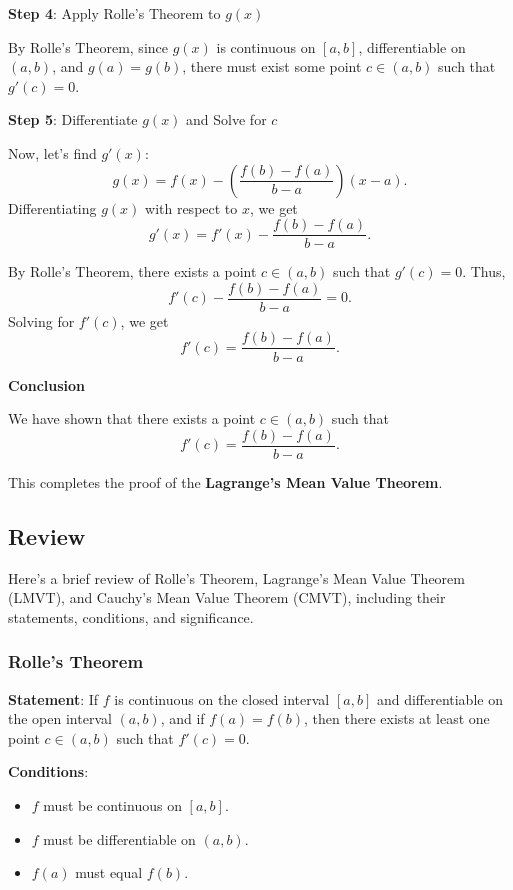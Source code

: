 \documentclass[a4paper,12pt]{book}
\begin{document}
\textbf{Step 4}: Apply Rolle's Theorem to \( g(x) \)

By Rolle's Theorem, since \( g(x) \) is continuous on \([a, b]\), differentiable on \((a, b)\), and \( g(a) = g(b) \), there must exist some point \( c \in (a, b) \) such that \( g'(c) = 0 \).

\textbf{Step 5}: Differentiate \( g(x) \) and Solve for \( c \)

Now, let’s find \( g'(x) \):
\[
g(x) = f(x) - \left( \dfrac{f(b) - f(a)}{b - a} \right) (x - a).
\]
Differentiating \( g(x) \) with respect to \( x \), we get
\[
g'(x) = f'(x) - \dfrac{f(b) - f(a)}{b - a}.
\]

By Rolle's Theorem, there exists a point \( c \in (a, b) \) such that \( g'(c) = 0 \). Thus,
\[
f'(c) - \dfrac{f(b) - f(a)}{b - a} = 0.
\]
Solving for \( f'(c) \), we get
\[
f'(c) = \dfrac{f(b) - f(a)}{b - a}.
\]

\textbf{Conclusion}

We have shown that there exists a point \( c \in (a, b) \) such that
\[
f'(c) = \dfrac{f(b) - f(a)}{b - a}.
\]

This completes the proof of the \textbf{Lagrange's Mean Value Theorem}.




\subsection{Review}

Here's a brief review of Rolle's Theorem, Lagrange's Mean Value Theorem (LMVT), and Cauchy's Mean Value Theorem (CMVT), including their statements, conditions, and significance.

\subsubsection{Rolle's Theorem}

\textbf{Statement}: If \( f \) is continuous on the closed interval \([a, b]\) and differentiable on the open interval \((a, b)\), and if \( f(a) = f(b) \), then there exists at least one point \( c \in (a, b) \) such that \( f'(c) = 0 \).

\hfill

\textbf{Conditions}:

\begin{itemize}
	\item 
	\( f \) must be continuous on \([a, b]\).
	\item 
	\( f \) must be differentiable on \((a, b)\).
	\item 
	\( f(a) \) must equal \( f(b) \).
\end{itemize}
\end{document}
